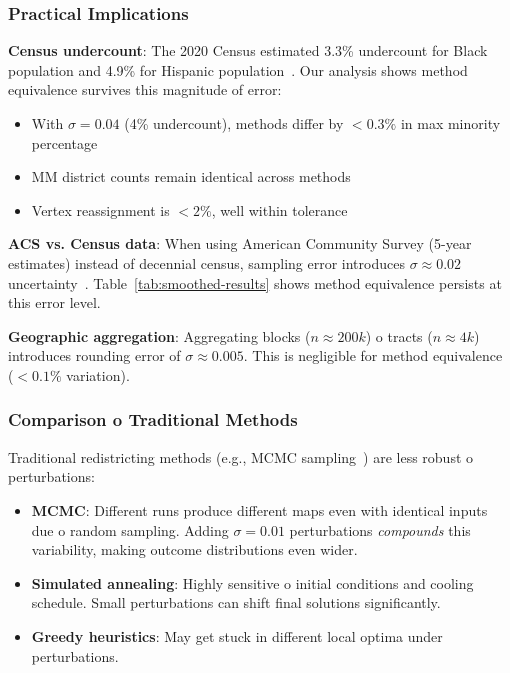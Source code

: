 \subsubsection{Practical Implications}

\textbf{Census undercount}: The 2020 Census estimated 3.3\% undercount for Black population and 4.9\% for Hispanic population~\cite{census2020undercount}. Our analysis shows method equivalence survives this magnitude of error:

\begin{itemize}
    \item With $\sigma = 0.04$ (4\% undercount), methods differ by $< 0.3\%$ in max minority percentage
    \item MM district counts remain identical across methods
    \item Vertex reassignment is $< 2\%$, well within tolerance
\end{itemize}

\textbf{ACS vs. Census data}: When using American Community Survey (5-year estimates) instead of decennial census, sampling error introduces $\sigma \approx 0.02$ uncertainty~\cite{acs2020}. Table~\ref{tab:smoothed-results} shows method equivalence persists at this error level.

\textbf{Geographic aggregation}: Aggregating blocks ($n \approx 200k$) 	o tracts ($n \approx 4k$) introduces rounding error of $\sigma \approx 0.005$. This is negligible for method equivalence ($< 0.1\%$ variation).

\subsubsection{Comparison 	o Traditional Methods}

Traditional redistricting methods (e.g., MCMC sampling~\cite{duchin2018gerrymandering}) are less robust 	o perturbations:

\begin{itemize}
    \item \textbf{MCMC}: Different runs produce different maps even with identical inputs due 	o random sampling. Adding $\sigma = 0.01$ perturbations \textit{compounds} this variability, making outcome distributions even wider.

    \item \textbf{Simulated annealing}: Highly sensitive 	o initial conditions and cooling schedule. Small perturbations can shift final solutions significantly.

    \item \textbf{Greedy heuristics}: May get stuck in different local optima under perturbations.
\end{itemize}

